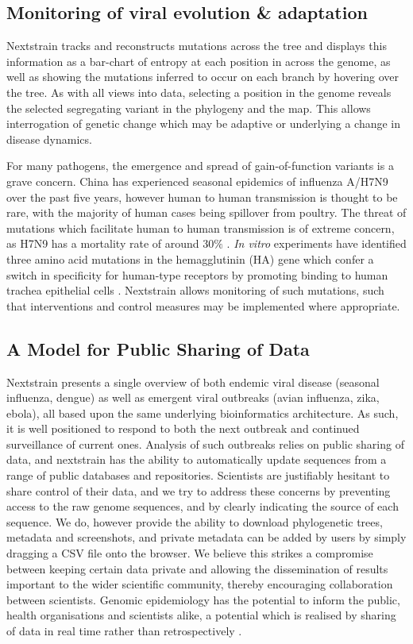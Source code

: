 \documentclass{bioinfo}
\begin{document}
\subsection*{Monitoring of viral evolution \& adaptation}
Nextstrain tracks and reconstructs mutations across the tree and displays this information as a bar-chart of entropy at each position in across the genome, as well as showing the mutations inferred to occur on each branch by hovering over the tree.
As with all views into data, selecting a position in the genome reveals the selected segregating variant in the phylogeny and the map.
This allows interrogation of genetic change which may be adaptive or underlying a change in disease dynamics.

For many pathogens, the emergence and spread of gain-of-function variants is a grave concern.
China has experienced seasonal epidemics of influenza A/H7N9 over the past five years, however human to human transmission is thought to be rare, with the majority of human cases being spillover from poultry.
The threat of mutations which facilitate human to human transmission is of extreme concern, as H7N9 has a mortality rate of around $30\%$ \citep{li2014epidemiology}.
\textit{In vitro} experiments have identified three amino acid mutations in the hemagglutinin (HA) gene which confer a switch in specificity for human-type receptors by promoting binding to human trachea epithelial cells \citep{devries2017three}.
Nextstrain allows monitoring of such mutations, such that interventions and control measures may be implemented where appropriate.


\subsection*{A Model for Public Sharing of Data}
Nextstrain presents a single overview of both endemic viral disease (seasonal influenza, dengue) as well as emergent viral outbreaks (avian influenza, zika, ebola), all based upon the same underlying bioinformatics architecture.
As such, it is well positioned to respond to both the next outbreak and continued surveillance of current ones.
Analysis of such outbreaks relies on public sharing of data, and nextstrain has the ability to automatically update sequences from a range of public databases and repositories.
Scientists are justifiably hesitant to share control of their data, and we try to address these concerns by preventing access to the raw genome sequences, and by clearly indicating the source of each sequence.
We do, however provide the ability to download phylogenetic trees, metadata and screenshots, and private metadata can be added by users by simply dragging a CSV file onto the browser.
We believe this strikes a compromise between keeping certain data private and allowing the dissemination of results important to the wider scientific community, thereby encouraging collaboration between scientists.
Genomic epidemiology has the potential to inform the public, health organisations and scientists alike, a potential which is realised by sharing of data in real time rather than retrospectively \citep{croucher2015application}.
\end{document}

